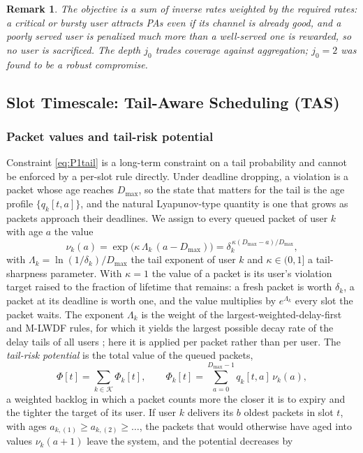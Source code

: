 \documentclass[journal]{IEEEtran}
\newtheorem{remark}{Remark}
\newcommand{\Dmax}{D_{\max}}
\newcommand{\Kset}{\mathcal{K}}
\begin{document}
\begin{remark}
The objective is a sum of inverse rates weighted by the required rates: a critical or bursty user attracts PAs even if its channel is already good, and a poorly served user is penalized much more than a well-served one is rewarded, so no user is sacrificed. The depth $j_0$ trades coverage against aggregation; $j_0=2$ was found to be a robust compromise.
\end{remark}

\subsection{Slot Timescale: Tail-Aware Scheduling (TAS)}\label{sec:tas}
\subsubsection{Packet values and tail-risk potential}
Constraint \eqref{eq:P1tail} is a long-term constraint on a tail probability and cannot be enforced by a per-slot rule directly. Under deadline dropping, a violation is a packet whose age reaches $\Dmax$, so the state that matters for the tail is the age profile $\{q_k[t,a]\}$, and the natural Lyapunov-type quantity is one that grows as packets approach their deadlines. We assign to every queued packet of user $k$ with age $a$ the value
\begin{equation}\label{eq:nu}
\nu_k(a)=\exp\big(\kappa\,\Lambda_k\,(a-\Dmax)\big)=\delta_k^{\,\kappa(\Dmax-a)/\Dmax},
\end{equation}
with $\Lambda_k=\ln(1/\delta_k)/\Dmax$ the tail exponent of user $k$ and
$\kappa\in(0,1]$ a tail-sharpness parameter. With $\kappa=1$ the value of a packet is its user's violation target raised to the fraction of lifetime that remains: a fresh packet is worth $\delta_k$, a packet at its deadline is worth one, and the value multiplies by $e^{\Lambda_k}$ every slot the packet waits. The exponent $\Lambda_k$ is the weight of the largest-weighted-delay-first and M-LWDF rules, for which it yields the largest possible decay rate of the delay tails of all users \cite{Stolyar2001LWDF,Andrews2001}; here it is applied per packet rather than per user. The \emph{tail-risk potential} is the total value of the queued packets,
\begin{equation}\label{eq:Phi}
\Phi[t]=\sum_{k\in\Kset}\Phi_k[t],\qquad \Phi_k[t]=\sum_{a=0}^{\Dmax-1}q_k[t,a]\,\nu_k(a),
\end{equation}
a weighted backlog in which a packet counts more the closer it is to expiry and the tighter the target of its user. If user $k$ delivers its $b$ oldest packets in slot $t$, with ages $a_{k,(1)}\ge a_{k,(2)}\ge\dots$, the packets that would otherwise have aged into values $\nu_k(a+1)$ leave the system, and the potential decreases by
\end{document}
